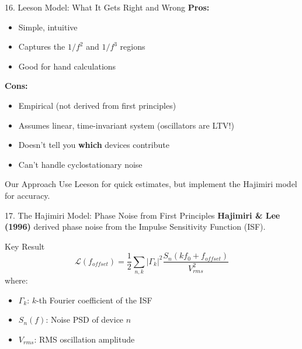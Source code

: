 \documentclass[aspectratio=169, 11pt]{beamer}
\begin{document}
\begin{frame}{16. Leeson Model: What It Gets Right and Wrong}
    \textbf{Pros:}
    \begin{itemize}
        \item Simple, intuitive
        \item Captures the $1/f^2$ and $1/f^3$ regions
        \item Good for hand calculations
    \end{itemize}

    \vspace{0.5em}
    \textbf{Cons:}
    \begin{itemize}
        \item Empirical (not derived from first principles)
        \item Assumes linear, time-invariant system (oscillators are LTV!)
        \item Doesn't tell you \textbf{which} devices contribute
        \item Can't handle cyclostationary noise
    \end{itemize}

    \vspace{0.5em}
    \begin{block}{Our Approach}
        Use Leeson for quick estimates, but implement the Hajimiri model for accuracy.
    \end{block}
\end{frame}

\begin{frame}{17. The Hajimiri Model: Phase Noise from First Principles}
    \textbf{Hajimiri \& Lee (1996)} derived phase noise from the Impulse Sensitivity Function (ISF).

    \vspace{0.5em}
    \begin{block}{Key Result}
        \[ \mathcal{L}(f_{offset}) = \frac{1}{2} \sum_{n,k} |\Gamma_k|^2 \frac{S_n(k f_0 + f_{offset})}{V_{rms}^2} \]
        where:
        \begin{itemize}
            \item $\Gamma_k$: $k$-th Fourier coefficient of the ISF
            \item $S_n(f)$: Noise PSD of device $n$
            \item $V_{rms}$: RMS oscillation amplitude
        \end{itemize}
    \end{block}
\end{frame}
\end{document}
